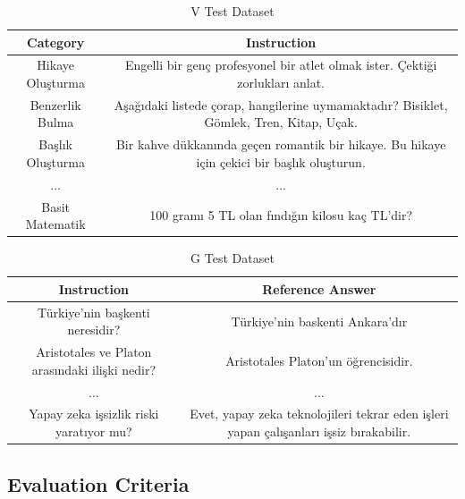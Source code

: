 \documentclass[conference]{IEEEtran}
\begin{document}

\begin{table}[htbp]
\caption{V Test Dataset}
\begin{center}
\begin{tabular}{|C|C|}
\hline
\textbf{Category} & \textbf{Instruction} \\
\hline
Hikaye Oluşturma & Engelli bir genç profesyonel bir atlet olmak ister. Çektiği zorlukları anlat. \\
\hline
Benzerlik Bulma & Aşağıdaki listede çorap, hangilerine uymamaktadır? Bisiklet, Gömlek, Tren, Kitap, Uçak. \\
\hline
Başlık Oluşturma & Bir kahve dükkanında geçen romantik bir hikaye. Bu hikaye için çekici bir başlık oluşturun. \\
\hline
... & ... \\
\hline
Basit Matematik & 100 gramı 5 TL olan fındığın kilosu kaç TL'dir? \\
\hline
\end{tabular}
\label{Vtestkumesitablosu}
\end{center}
\end{table}

\begin{table}[htbp]
\caption{G Test Dataset}
\begin{center}
\begin{tabular}{|C|C|}
\hline
\textbf{Instruction} & \textbf{Reference Answer} \\
\hline
Türkiye’nin başkenti neresidir? & Türkiye’nin baskenti Ankara’dır \\
\hline
Aristotales ve Platon arasındaki
ilişki nedir? & Aristotales Platon’un öğrencisidir. \\
\hline
... & ... \\
\hline
Yapay zeka işsizlik riski yaratıyor mu? & Evet, yapay zeka teknolojileri tekrar eden işleri yapan çalışanları işsiz bırakabilir. \\
\hline
\end{tabular}
\label{your_label_here}
\end{center}
\end{table}


\subsection{Evaluation Criteria}
\end{document}
